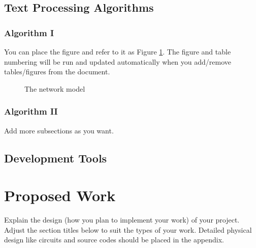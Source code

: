 \documentclass[12pt,oneside,openright,a4paper]{explo-english-project}
\begin{document}
\section{Text Processing Algorithms}
\subsection{Algorithm I}


You can place the figure and refer to it as Figure \ref{fig:model2}.
The figure and table numbering will be run and updated automatically when you add/remove tables/figures from the document.

\begin{figure}[!h]\centering
\setlength{\fboxrule}{0.2mm} %
\setlength{\fboxsep}{1cm}
\caption{The network model}\label{fig:model2}
\end{figure}

 
\subsection{Algorithm II}
Add more subsections as you want.


\section{Development Tools}


\chapter{Proposed Work}

Explain the design (how you plan to implement your work) of your project. Adjust the section titles below to suit the types of your work. Detailed physical design like circuits and source codes should be placed in the appendix.
\end{document}
